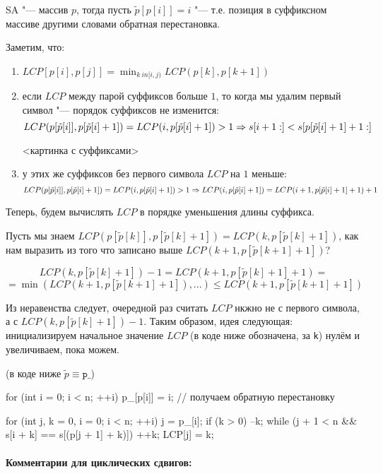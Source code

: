 SA "--- массив $p$, тогда пусть $\tilde{p}[p[i]] = i$ "--- т.е. позиция в суффиксном массиве другими словами обратная перестановка.

Заметим, что:
\begin{enumerate}
	\item $LCP[p[i], p[j]] = \min_{k \ in [i, j)} LCP(p[k], p[k + 1])$
	\item если $LCP$ между парой суффиксов больше $1$, то когда мы удалим первый символ "--- порядок суффиксов не изменится:
			\[LCP(p[\tilde{p}[i]], p[\tilde{p}[i] + 1]) = LCP(i, p[\tilde{p}[i] + 1]) > 1 \Rightarrow s[i + 1:] < s[p[\tilde{p}[i] + 1] + 1:]\]

	<картинка с суффиксами>
	
	\item у этих же суффиксов без первого символа $LCP$ на $1$ меньше:
		\[ LCP(p[\tilde{p}[i]], p[\tilde{p}[i] + 1]) = LCP(i, p[\tilde{p}[i] + 1]) > 1 \Rightarrow LCP(i, p[\tilde{p}[i] + 1]) = LCP(i + 1, p[\tilde{p}[i] + 1] + 1) + 1 \]
\end{enumerate} 

Теперь, будем вычислять $LCP$ в порядке уменьшения длины суффикса. 

Пусть мы знаем $LCP(p[\tilde{p}[k]], p[\tilde{p}[k] + 1]) = LCP(k, p[\tilde{p}[k] + 1])$, как нам выразить из 
того что записано выше $LCP(k + 1, p[\tilde{p}[k + 1] + 1])$?

\[ LCP(k, p[\tilde{p}[k] + 1]) - 1 = LCP(k + 1, p[\tilde{p}[k] + 1] + 1) =  \]
\[= \min (LCP(k + 1, p[\tilde{p}[k + 1] + 1]),...) \leq LCP(k + 1, p[\tilde{p}[k + 1] + 1]) \]

Из неравенства следует, очередной раз считать $LCP$ нкжно не с первого символа, а с $LCP(k, p[\tilde{p}[k] + 1]) - 1$.
Таким образом, идея следующая: инициализируем начальное значение $LCP$ (в коде ниже обозначена, за \texttt{k}) нулём и увеличиваем, пока можем.

(в коде ниже $\tilde{p} \equiv \texttt{p\_}$)
\begin{cppcode}
for (int i = 0; i < n; ++i) 
		p_[p[i]] = i;		// получаем обратную перестановку

for (int j, k = 0, i = 0; i < n; ++i) {
		j = p_[i];
		if (k > 0) --k;
		while (j + 1 < n && s[i + k] == s[(p[j + 1] + k)])
			++k;
		LCP[j] = k;
	}
\end{cppcode}

\paragraph*{Комментарии для циклических сдвигов:}

